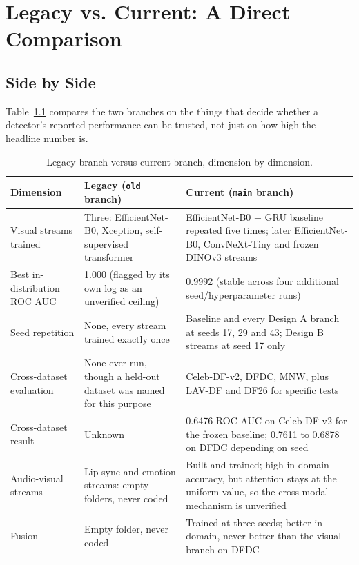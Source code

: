 \chapter{Legacy vs. Current: A Direct Comparison}
\label{ch:comparison}

\section{Side by Side}

Table~\ref{tab:headtohead} compares the two branches on the things that decide
whether a detector's reported performance can be trusted, not just on how high
the headline number is.

\begin{table}[ht]
    \centering
    \caption{Legacy branch versus current branch, dimension by dimension.}
    \label{tab:headtohead}
    \begin{tabular}{p{3.6cm}p{5.4cm}p{5.4cm}}
        \toprule
        \textbf{Dimension} & \textbf{Legacy (\texttt{old} branch)} & \textbf{Current (\texttt{main} branch)} \\
        \midrule
        Visual streams trained & Three: EfficientNet-B0, Xception, self-supervised transformer & EfficientNet-B0 + GRU baseline repeated five times; later EfficientNet-B0, ConvNeXt-Tiny and frozen DINOv3 streams \\
        Best in-distribution ROC AUC & 1.000 (flagged by its own log as an unverified ceiling) & 0.9992 (stable across four additional seed/hyperparameter runs) \\
        Seed repetition & None, every stream trained exactly once & Baseline and every Design A branch at seeds 17, 29 and 43; Design B streams at seed 17 only \\
        Cross-dataset evaluation & None ever run, though a held-out dataset was named for this purpose & Celeb-DF-v2, DFDC, MNW, plus LAV-DF and DF26 for specific tests \\
        Cross-dataset result & Unknown & 0.6476 ROC AUC on Celeb-DF-v2 for the frozen baseline; 0.7611 to 0.6878 on DFDC depending on seed \\
        Audio-visual streams & Lip-sync and emotion streams: empty folders, never coded & Built and trained; high in-domain accuracy, but attention stays at the uniform value, so the cross-modal mechanism is unverified \\
        Fusion & Empty folder, never coded & Trained at three seeds; better in-domain, never better than the visual branch on DFDC \\

\end{tabular}
\end{table}
